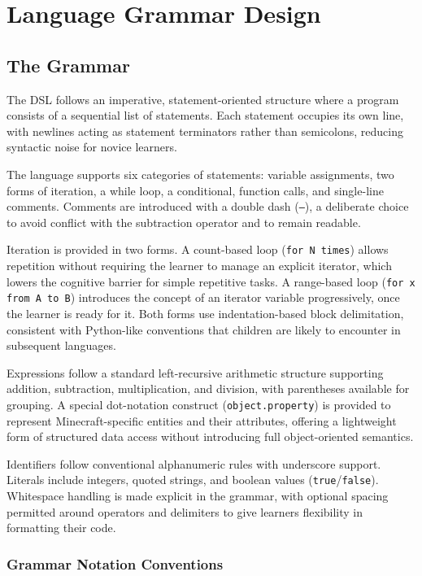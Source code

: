 \chapter{Language Grammar Design}

\section{The Grammar}

The DSL follows an imperative, statement-oriented structure where a program consists of a sequential list of statements. 
Each statement occupies its own line, with newlines acting as statement terminators rather than semicolons, reducing syntactic noise for novice learners.

The language supports six categories of statements: variable assignments, two forms of iteration, a while loop, a conditional, function calls, and single-line comments. 
Comments are introduced with a double dash (\texttt{--}), a deliberate choice to avoid conflict with the subtraction operator and to remain readable.

Iteration is provided in two forms. 
A count-based loop (\texttt{for N times}) allows repetition without requiring the learner to manage an explicit iterator, which lowers the cognitive barrier for simple repetitive tasks. 
A range-based loop (\texttt{for x from A to B}) introduces the concept of an iterator variable progressively, once the learner is ready for it. 
Both forms use indentation-based block delimitation, consistent with Python-like conventions that children are likely to encounter in subsequent languages.

Expressions follow a standard left-recursive arithmetic structure supporting addition, subtraction, multiplication, and division, with parentheses available for grouping. 
A special dot-notation construct (\texttt{object.property}) is provided to represent Minecraft-specific entities and their attributes, offering a lightweight form of structured data access without introducing full object-oriented semantics.

Identifiers follow conventional alphanumeric rules with underscore support. 
Literals include integers, quoted strings, and boolean values (\texttt{true}/\texttt{false}). 
Whitespace handling is made explicit in the grammar, with optional spacing permitted around operators and delimiters to give learners flexibility in formatting their code.

\subsection{Grammar Notation Conventions}

